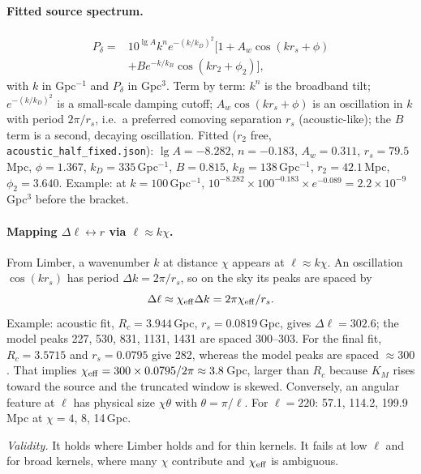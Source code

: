 \documentclass[11pt]{article}
\newcommand{\why}[1]{\par\noindent\textit{Validity.} #1\par}
\begin{document}
\paragraph{Fitted source spectrum.} 
\begin{equation}\label{r6:eq19}\begin{split}
P_\delta=&10^{\lg A}k^{n}e^{-(k/k_D)^2}\big[1+A_w\cos(kr_s+\phi)\\
&+Be^{-k/k_B}\cos(kr_2+\phi_2)\big],
\end{split}\end{equation}
with $k$ in Gpc$^{-1}$ and $P_\delta$ in Gpc$^3$. Term by term: $k^n$ is the broadband tilt; $e^{-(k/k_D)^2}$ is a small-scale damping cutoff; $A_w\cos(kr_s+\phi)$ is an oscillation in $k$ with period $2\pi/r_s$, i.e.\ a preferred comoving separation $r_s$ (acoustic-like); the $B$ term is a second, decaying oscillation. Fitted ($r_2$ free, \texttt{acoustic\_half\_fixed.json}): $\lg A=-8.282$, $n=-0.183$, $A_w=0.311$, $r_s=79.5$\,Mpc, $\phi=1.367$, $k_D=335$\,Gpc$^{-1}$, $B=0.815$, $k_B=138$\,Gpc$^{-1}$, $r_2=42.1$\,Mpc, $\phi_2=3.640$. Example: at $k=100$\,Gpc$^{-1}$, $10^{-8.282}\times100^{-0.183}\times e^{-0.089}=2.2\times10^{-9}$\,Gpc$^3$ before the bracket.

\paragraph{Mapping $\Delta\ell\leftrightarrow r$ via $\ell\approx k\chi$.} From Limber, a wavenumber $k$ at distance $\chi$ appears at $\ell\approx k\chi$. An oscillation $\cos(kr_s)$ has period $\Delta k=2\pi/r_s$, so on the sky its peaks are spaced by
\begin{equation}\label{r6:eq20}
\Delta\ell\approx\chi_{\rm eff}\Delta k=2\pi\chi_{\rm eff}/r_s .
\end{equation}
Example: acoustic fit, $R_c=3.944$\,Gpc, $r_s=0.0819$\,Gpc, gives $\Delta\ell=302.6$; the model peaks 227, 530, 831, 1131, 1431 are spaced 300--303. For the final fit, $R_c=3.5715$ and $r_s=0.0795$ give 282, whereas the model peaks are spaced $\approx300$. That implies $\chi_{\rm eff}=300\times0.0795/2\pi\approx3.8$\,Gpc, larger than $R_c$ because $K_M$ rises toward the source and the truncated window is skewed. Conversely, an angular feature at $\ell$ has physical size $\chi\theta$ with $\theta=\pi/\ell$. For $\ell=220$: 57.1, 114.2, 199.9\,Mpc at $\chi=4$, 8, 14\,Gpc.
\why{It holds where Limber holds and for thin kernels. It fails at low $\ell$ and for broad kernels, where many $\chi$ contribute and $\chi_{\rm eff}$ is ambiguous.}
\end{document}
